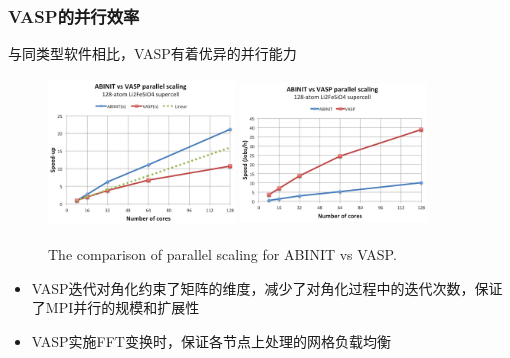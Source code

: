 \frame
{
	\frametitle{\textrm{VASP}的并行效率}
	与同类型软件相比，\textrm{VASP}有着优异的并行能力
\begin{figure}[h!]
	\vspace{-0.15in}
\centering
\includegraphics[height=1.55in,width=1.95in,viewport=0 0 240 200,clip]{Figures/VASP-abinit_Li128-1.png}
\includegraphics[height=1.55in,width=1.95in,viewport=0 0 240 200,clip]{Figures/VASP-abinit_Li128-2.png}
\caption{\tiny \textrm{The comparison of parallel scaling for ABINIT vs VASP.}}%
\label{ABINIT_vs_VASP}
\end{figure} 
\begin{itemize}
	\item \textrm{VASP}迭代对角化约束了矩阵的维度，减少了对角化过程中的迭代次数，保证了\textrm{MPI}并行的规模和扩展性
	\item \textrm{VASP}实施\textrm{FFT}变换时，保证各节点上处理的网格负载均衡
\end{itemize}
}

